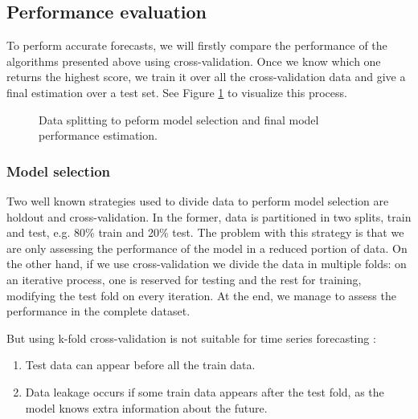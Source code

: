 \subsection{Performance evaluation}
To perform accurate forecasts, we will firstly compare the performance of the algorithms presented above using cross-validation. Once we know which one returns the highest score, we train it over all the cross-validation data and give a final estimation over a test set. See Figure \ref{fig:cross-train-test} to visualize this process.

\begin{figure}[H]
\centering
    \caption{Data splitting to peform model selection and final model performance estimation.}
    \label{fig:cross-train-test}
\end{figure}

\subsubsection{Model selection}
Two well known strategies used to divide data to perform model selection are holdout and cross-validation.
In the former, data is partitioned in two splits, train and test, e.g. 80\% train and 20\% test.
The problem with this strategy is that we are only assessing the performance of the model in a reduced portion of data.
On the other hand, if we use cross-validation we divide the data in multiple folds: on an iterative process, one is reserved for testing and the rest for training, modifying the test fold on every iteration.
At the end, we manage to assess the performance in the complete dataset.

\noindent But using k-fold cross-validation is not suitable for time series forecasting \cite{cross-validation-types}:
\begin{enumerate}
    \item Test data can appear before all the train data.
    \item Data leakage occurs if some train data appears after the test fold, as the model knows extra information about the future.
\end{enumerate}

